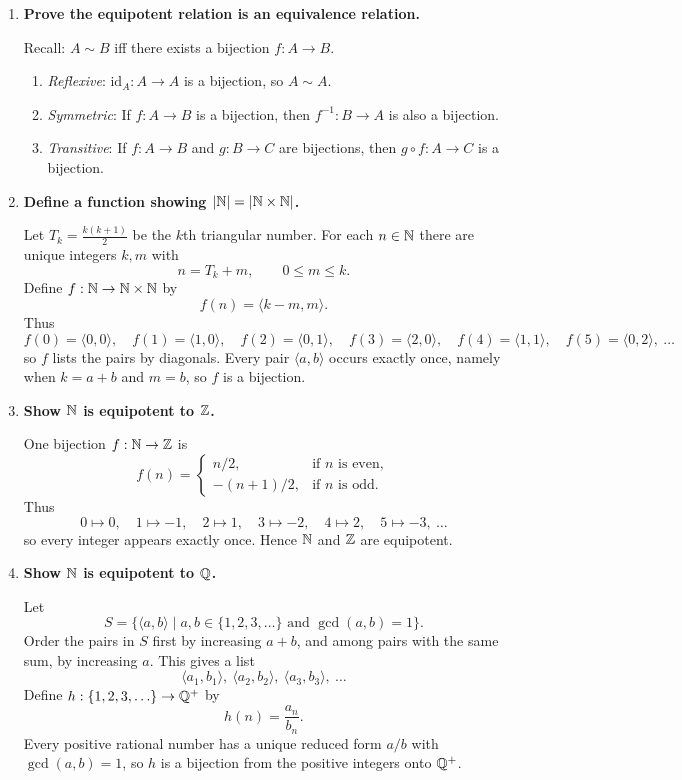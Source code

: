 \begin{enumerate}[{0.}1. ]
\item \textbf{Prove the equipotent relation is an equivalence relation.}

Recall: $A \sim B$ iff there exists a bijection $f: A\to B$.

\begin{enumerate}
\item \textit{Reflexive}: $\mathrm{id}_A: A\to A$ is a bijection, so $A\sim A$.
\item \textit{Symmetric}: If $f: A\to B$ is a bijection, then $f^{-1}: B\to A$ is also a bijection.
\item \textit{Transitive}: If $f: A\to B$ and $g: B\to C$ are bijections, then $g\circ f: A\to C$ is a bijection.
\end{enumerate}

\item \textbf{Define a function showing $|\mathbb{N}|=|\mathbb{N}\times\mathbb{N}|$.}

Let $T_k=\frac{k(k+1)}{2}$ be the $k$th triangular number. For each $n\in\mathbb{N}$
there are unique integers $k,m$ with
\[
n=T_k+m,\qquad 0\le m\le k.
\]
Define $f:\mathbb{N}\to\mathbb{N}\times\mathbb{N}$ by
\[
f(n)=\langle k-m,m\rangle.
\]
Thus
\[
f(0)=\langle 0,0\rangle,\quad
f(1)=\langle 1,0\rangle,\quad
f(2)=\langle 0,1\rangle,\quad
f(3)=\langle 2,0\rangle,\quad
f(4)=\langle 1,1\rangle,\quad
f(5)=\langle 0,2\rangle,\ \ldots
\]
so $f$ lists the pairs by diagonals. Every pair $\langle a,b\rangle$ occurs exactly
once, namely when $k=a+b$ and $m=b$, so $f$ is a bijection.

\item \textbf{Show $\mathbb{N}$ is equipotent to $\mathbb{Z}$.}

One bijection $f:\mathbb{N}\to\mathbb{Z}$ is
\[
f(n)=
\begin{cases}
n/2, & \text{if $n$ is even},\\
-(n+1)/2, & \text{if $n$ is odd}.
\end{cases}
\]
Thus
\[
0\mapsto 0,\quad 1\mapsto -1,\quad 2\mapsto 1,\quad 3\mapsto -2,\quad
4\mapsto 2,\quad 5\mapsto -3,\ \ldots
\]
so every integer appears exactly once. Hence $\mathbb{N}$ and $\mathbb{Z}$ are equipotent.

\item \textbf{Show $\mathbb{N}$ is equipotent to $\mathbb{Q}$.}

Let
\[
S=\{\langle a,b\rangle \mid a,b\in\{1,2,3,\ldots\}\text{ and }\gcd(a,b)=1\}.
\]
Order the pairs in $S$ first by increasing $a+b$, and among pairs with the same
sum, by increasing $a$. This gives a list
\[
\langle a_1,b_1\rangle,\ \langle a_2,b_2\rangle,\ \langle a_3,b_3\rangle,\ \ldots
\]
Define $h:\{1,2,3,\ldots\}\to\mathbb{Q}^+$ by
\[
h(n)=\frac{a_n}{b_n}.
\]
Every positive rational number has a unique reduced form $a/b$ with
$\gcd(a,b)=1$, so $h$ is a bijection from the positive integers onto $\mathbb{Q}^+$.


\end{enumerate}
